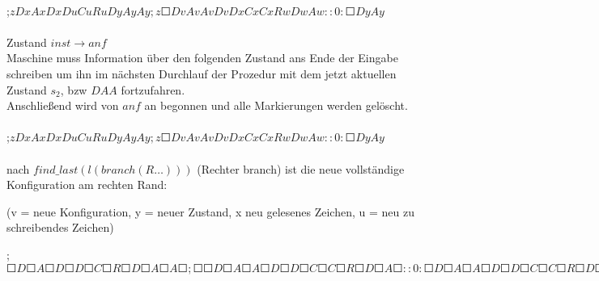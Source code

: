 \documentclass[10pt, a4paper]{article}
\begin{document}
\begin{small}
\par
\paragraph{}
;$z D x  A x  D x  D u  C u R u  D y  A y  A y ; z  \Square D v  A v  A v  D v  D x  C x  C x  R w  D w  A  w  :: 0 : \Square D y A y$
\end{small}\par

\paragraph{}
Zustand $inst\rightarrow anf$\\
Maschine muss Information über den folgenden Zustand ans Ende der Eingabe schreiben um ihn im nächsten Durchlauf der Prozedur mit dem jetzt aktuellen Zustand $s_2$, bzw $DAA$ fortzufahren.\\
Anschließend wird von $anf$ an begonnen und alle Markierungen werden gelöscht.


\begin{small}
\par
\paragraph{}
;$z D x  A x  D x  D u  C u R u  D y  A y  A y ; z  \Square D v  A v  A v  D v  D x  C x  C x  R w  D w  A  w  ::0: \Square D y A y$
\end{small}\par
\paragraph{}
nach $find\_last(l(branch(R \dots )))$ (Rechter branch) ist die neue vollständige Konfiguration am rechten Rand:

(v = neue Konfiguration, y = neuer Zustand, x neu gelesenes Zeichen, u = neu zu schreibendes Zeichen)\par
\begin{small}
;$\Square D\Square A\Square D\Square D\Square C\Square R\Square D\Square A\Square A\Square ;\Square \Square D\Square A\Square A\Square D\Square D\Square C\Square C\Square R\Square D\Square A\Square :: 0 : \Square D \Square A \Square A \Square D\Square D\Square C\Square C\Square R\Square D\Square A \Square$\\
\end{small}\par
\end{document}

